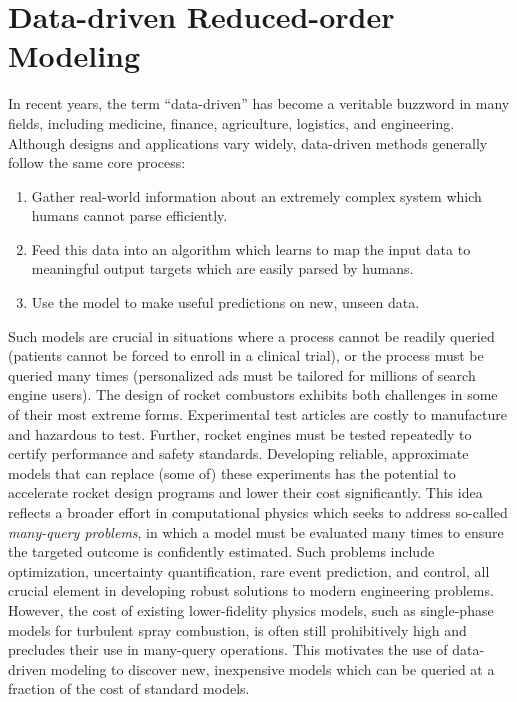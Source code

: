\section{Data-driven Reduced-order Modeling}\label{sec:dataDrivenModeling}

In recent years, the term ``data-driven'' has become a veritable buzzword in many fields, including medicine, finance, agriculture, logistics, and engineering. Although designs and applications vary widely, data-driven methods generally follow the same core process:

\begin{enumerate}
    \item Gather real-world information about an extremely complex system which humans cannot parse efficiently.
    \item Feed this data into an algorithm which learns to map the input data to meaningful output targets which are easily parsed by humans.
    \item Use the model to make useful predictions on new, unseen data.
\end{enumerate}

Such models are crucial in situations where a process cannot be readily queried (patients cannot be forced to enroll in a clinical trial), or the process must be queried many times (personalized ads must be tailored for millions of search engine users). The design of rocket combustors exhibits both challenges in some of their most extreme forms. Experimental test articles are costly to manufacture and hazardous to test. Further, rocket engines must be tested repeatedly to certify performance and safety standards. Developing reliable, approximate models that can replace (some of) these experiments has the potential to accelerate rocket design programs and lower their cost significantly. This idea reflects a broader effort in computational physics which seeks to address so-called \textit{many-query problems}, in which a model must be evaluated many times to ensure the targeted outcome is confidently estimated. Such problems include optimization, uncertainty quantification, rare event prediction, and control, all crucial element in developing robust solutions to modern engineering problems. However, the cost of existing lower-fidelity physics models, such as single-phase models for turbulent spray combustion, is often still prohibitively high and precludes their use in many-query operations. This motivates the use of data-driven modeling to discover new, inexpensive models which can be queried at a fraction of the cost of standard models.

